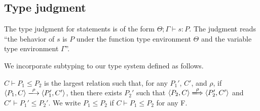 \subsection{Type judgment}

The type judgment for statements is of the form \(\Theta; \Gamma \vdash
s : P \).  The judgment reads ``the behavior of $s$ is $P$ under the
function type environment $\Theta$ and the variable type environment
$\Gamma$''.

We incorporate subtyping to our type system defined as follows.
\begin{myDef}[Subtyping]
\label{df:subtype} \(C \vdash P_1 \le P_2\) is the largest relation such
that, for any \(P_1'\), $C'$, and \(\rho\), if \( \langle P_1, C \rangle
\xlongrightarrow{\rho} \langle P_1', C' \rangle \), then there exists
\(P_2'\) such that \( \langle P_2, C \rangle \xLongrightarrow{\rho}
\langle P_2', C' \rangle \) and \(C' \vdash P_1' \le P_2'\).  We write
\(P_1 \le P_2\) if \(C \vdash P_1 \le P_2\) for any F.
\end{myDef}

